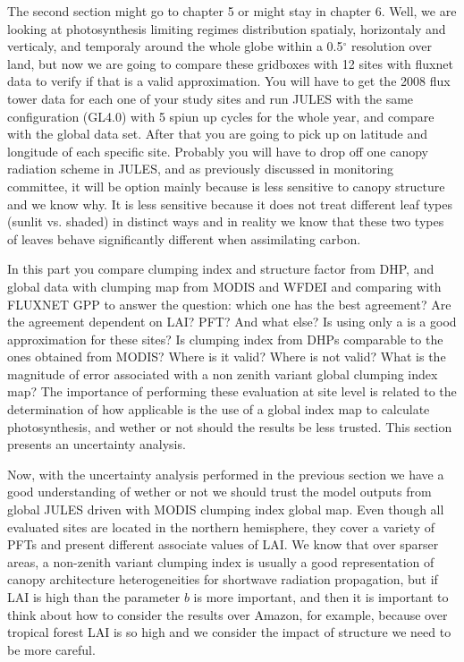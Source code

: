 The second section might go to chapter 5 or might stay in chapter 6. Well, we are looking at photosynthesis limiting regimes distribution spatialy, horizontaly and verticaly, and temporaly around the whole globe within a 0.5$^{\circ}$ resolution over land, but now we are going to compare these gridboxes with 12 sites with fluxnet data to verify if that is a valid approximation. You will have to get the 2008 flux tower data for each one of your study sites and run JULES with the same configuration (GL4.0) with 5 spiun up cycles for the whole year, and compare with the global data set. After that you are going to pick up on latitude and longitude of each specific site. Probably you will have to drop off one canopy radiation scheme in JULES, and as previously discussed in monitoring committee, it will be option mainly because is less sensitive to canopy structure and we know why. It is less sensitive because it does not treat different leaf types (sunlit vs. shaded) in distinct ways and in reality we know that these two types of leaves behave significantly different when assimilating carbon.

In this part you compare clumping index and structure factor from DHP, and global data with clumping map from MODIS and WFDEI and comparing with FLUXNET GPP to answer the question: which one has the best agreement? Are the agreement dependent on LAI? PFT? And what else? Is using only a is a good approximation for these sites? Is clumping index from DHPs comparable to the ones obtained from MODIS? Where is it valid? Where is not valid? What is the magnitude of error associated with a non zenith variant global clumping index map? The importance of performing these evaluation at site level is related to the determination of how applicable is the use of a global index map to calculate photosynthesis, and wether or not should the results be less trusted. This section presents an uncertainty analysis.

Now, with the uncertainty analysis performed in the previous section we have a good understanding of wether or not we should trust the model outputs from global JULES driven with MODIS clumping index global map. Even though all evaluated sites are located in the northern hemisphere, they cover a variety of PFTs and present different associate values of LAI. We know that over sparser areas, a non-zenith variant clumping index is usually a good representation of canopy architecture heterogeneities for shortwave radiation propagation, but if LAI is high than the parameter $b$ is more important, and then it is important to think about how to consider the results over Amazon, for example, because over tropical forest LAI is so high and we consider the impact of structure we need to be more careful. 

